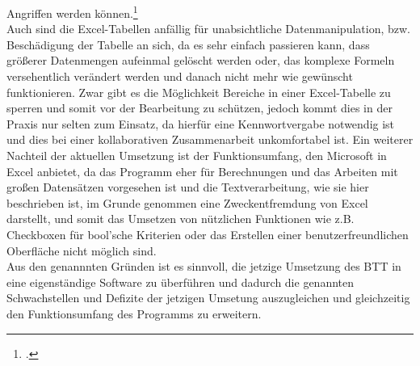Angriffen werden können.\footcite[Vgl.][]{jemehrdesto}\\Auch sind die Excel-Tabellen anfällig für unabsichtliche Datenmanipulation, bzw. Beschädigung der Tabelle an sich, da es sehr einfach passieren kann, dass größerer Datenmengen aufeinmal gelöscht werden oder, das komplexe Formeln versehentlich verändert werden und danach nicht mehr wie gewünscht funktionieren. Zwar gibt es die Möglichkeit Bereiche in einer Excel-Tabelle zu sperren und somit vor der Bearbeitung zu schützen, jedoch kommt dies in der Praxis nur selten zum Einsatz, da hierfür eine Kennwortvergabe notwendig ist und dies bei einer kollaborativen Zusammenarbeit unkomfortabel ist. Ein weiterer Nachteil der aktuellen Umsetzung ist der Funktionsumfang, den Microsoft in Excel anbietet, da das Programm eher für Berechnungen und das Arbeiten mit großen Datensätzen vorgesehen ist und die Textverarbeitung, wie sie hier beschrieben ist, im Grunde genommen eine Zweckentfremdung von Excel darstellt, und somit das Umsetzen von nützlichen Funktionen wie z.B. Checkboxen für bool'sche Kriterien oder das Erstellen einer benutzerfreundlichen Oberfläche nicht möglich sind.\\ Aus den genannnten Gründen ist es sinnvoll, die jetzige Umsetzung des BTT in eine eigenständige Software zu überführen und dadurch die genannten Schwachstellen und Defizite der jetzigen Umsetung auszugleichen und gleichzeitig den Funktionsumfang des Programms zu erweitern.





